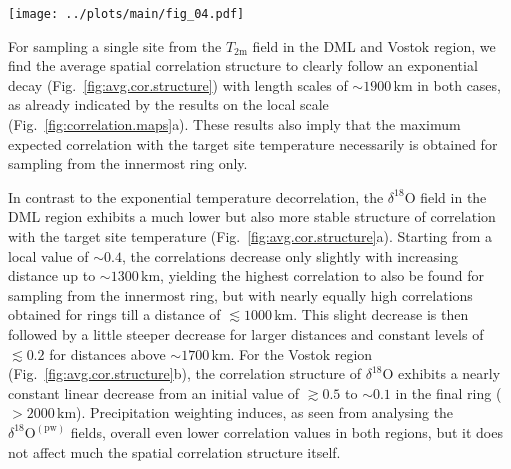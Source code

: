 \documentclass[cp, manuscript]{copernicus}
\begin{document}
\begin{figure*}[t]%
\centering
\texttt{[image: ../plots/main/fig\_04.pdf]}
\caption{%
  Spatial temperature correlation structures for the DML and Vostok regions.
  Shown is the average correlation as a function of distance between the
  interannual near-surface temperature ($T_{2\mathrm{m}}$) at a target site and
  the spatial fields of $T_{2\mathrm{m}}$ (black), oxygen isotope composition
  ($\delta^{18}\mathrm{O}$, green) and precipitation-weighted oxygen isotope
  composition ($\delta^{18}\mathrm{O}^{\mathrm{(pw)}}$, blue). Averaging is
  performed in two steps: first, correlations are averaged across grid cells
  falling in $250$\,km wide consecutive rings around a given target site, and
  secondly, these results are averaged across all respective target sites in the
  DML (\textbf{a}) and Vostok (\textbf{b}) region (see Methods). Dashed lines
  indicate an exponential fit to the $T_{2\mathrm{m}}$ data.}
\label{fig:avg.cor.structure}%
\end{figure*}%

For sampling a single site from the $T_{\mathrm{2m}}$ field in the DML and
Vostok region, we find the average spatial correlation structure to clearly
follow an exponential decay (Fig.~\ref{fig:avg.cor.structure}) with length
scales of $\sim1900$\,km in both cases, as already indicated by the results on
the local scale (Fig.~\ref{fig:correlation.maps}a). These results also imply
that the maximum expected correlation with the target site temperature
necessarily is obtained for sampling from the innermost ring only.

In contrast to the exponential temperature decorrelation, the
$\delta^{18}\mathrm{O}$ field in the DML region exhibits a much lower but also
more stable structure of correlation with the target site temperature
(Fig.~\ref{fig:avg.cor.structure}a). Starting from a local value of $\sim0.4$,
the correlations decrease only slightly with increasing distance up to
$\sim1300$\,km, yielding the highest correlation to also be found for sampling
from the innermost ring, but with nearly equally high correlations obtained for
rings till a distance of $\lesssim1000$\,km. This slight decrease is then
followed by a little steeper decrease for larger distances and constant levels
of $\lesssim0.2$ for distances above $\sim1700$\,km. For the Vostok region
(Fig.~\ref{fig:avg.cor.structure}b), the correlation structure of
$\delta^{18}\mathrm{O}$ exhibits a nearly constant linear decrease from an
initial value of $\gtrsim0.5$ to $\sim0.1$ in the final ring ($>2000$\,km).
Precipitation weighting induces, as seen from analysing the
$\delta^{18}\mathrm{O}^{\mathrm{(pw)}}$ fields, overall even lower correlation
values in both regions, but it does not affect much the spatial correlation
structure itself.
\end{document}
